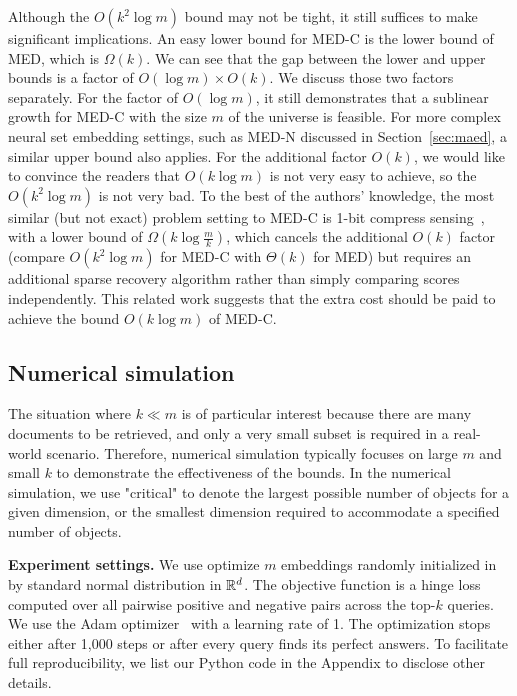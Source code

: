 \documentclass[10pt]{article}
\begin{document}
Although the $O(k^2\log m)$ bound may not be tight, it still suffices to make significant implications. An easy lower bound for MED-C is the lower bound of MED, which is $\Omega(k)$. We can see that the gap between the lower and upper bounds is a factor of $O(\log m)\times O(k)$. We discuss those two factors separately. For the factor of $O(\log m)$, it still demonstrates that a sublinear growth for MED-C with the size $m$ of the universe is feasible. For more complex neural set embedding settings, such as MED-N discussed in Section~\ref{sec:maed}, a similar upper bound also applies. For the additional factor $O(k)$, we would like to convince the readers that $O(k\log m)$ is not very easy to achieve, so the $O(k^2 \log m)$ is not very bad. To the best of the authors' knowledge, the most similar (but not exact) problem setting to MED-C is 1-bit compress sensing~\cite{aksoylar2014information}, with a lower bound of $\Omega(k\log \frac{m}{k}) $, which cancels the additional $O(k)$ factor (compare $O(k^2\log m)$ for MED-C with $\Theta(k)$ for MED) but requires an additional sparse recovery algorithm rather than simply comparing scores independently. This related work suggests that the extra cost should be paid to achieve the bound $O(k\log m)$ of MED-C.


\subsection{Numerical simulation}

The situation where $k \ll m$ is of particular interest because there are many documents to be retrieved, and only a very small subset is required in a real-world scenario. Therefore, numerical simulation typically focuses on large $m$ and small $k$ to demonstrate the effectiveness of the bounds.
In the numerical simulation, we use "critical" to denote the largest possible number of objects for a given dimension, or the smallest dimension required to accommodate a specified number of objects.

\noindent\textbf{Experiment settings.} We use optimize $m$ embeddings randomly initialized in by standard normal distribution in $\mathbb{R}^d$. The objective function is a hinge loss computed over all pairwise positive and negative pairs across the top-$k$ queries. We use the Adam optimizer~\cite{kingma2014adam} with a learning rate of 1. The optimization stops either after 1,000 steps or after every query finds its perfect answers. To facilitate full reproducibility, we list our Python code in the Appendix to disclose other details.
\end{document}
